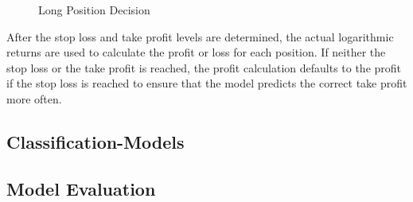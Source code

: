 \begin{figure}[H]
    \centering
    
    \caption{Long Position Decision}
    \label{fig:loss-tp-sl}
\end{figure}

After the stop loss and take profit levels are determined, the actual logarithmic returns are used to calculate the profit or loss for each position.
If neither the stop loss or the take profit is reached, the profit calculation defaults to the profit if the stop loss is reached to ensure that the model predicts the correct take profit more often.

\subsection{Classification-Models}

\subsection{Model Evaluation}